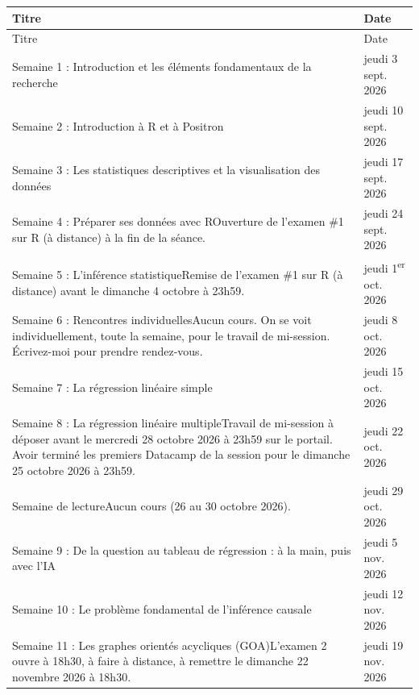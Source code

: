 \documentclass[10pt]{article}
\begin{document}
\vspace{4pt}
{\setlength{\arrayrulewidth}{0.4pt}\fontsize{9.5}{12}\selectfont
\noindent\begin{longtable}{|L{5.72in}|L{1.42in}|}
\hline
{}Titre & Date\\
\hline
\endfirsthead
\hline
{}Titre & Date\\
\hline
\endhead
Semaine 1 : Introduction et les éléments fondamentaux de la recherche & jeudi 3 sept. 2026\\
\hline
Semaine 2 : Introduction à R et à Positron & jeudi 10 sept. 2026\\
\hline
Semaine 3 : Les statistiques descriptives et la visualisation des données & jeudi 17 sept. 2026\\
\hline
Semaine 4 : Préparer ses données avec R\newline Ouverture de l'examen \#1 sur R (à distance) à la fin de la séance. & jeudi 24 sept. 2026\\
\hline
Semaine 5 : L'inférence statistique\newline Remise de l'examen \#1 sur R (à distance) avant le dimanche 4 octobre à 23h59. & jeudi 1\textsuperscript{er} oct. 2026\\
\hline
Semaine 6 : Rencontres individuelles\newline Aucun cours. On se voit individuellement, toute la semaine, pour le travail de mi-session. Écrivez-moi pour prendre rendez-vous. & jeudi 8 oct. 2026\\
\hline
Semaine 7 : La régression linéaire simple & jeudi 15 oct. 2026\\
\hline
Semaine 8 : La régression linéaire multiple\newline Travail de mi-session à déposer avant le mercredi 28 octobre 2026 à 23h59 sur le portail. Avoir terminé les premiers Datacamp de la session pour le dimanche 25 octobre 2026 à 23h59. & jeudi 22 oct. 2026\\
\hline
Semaine de lecture\newline Aucun cours (26 au 30 octobre 2026). & jeudi 29 oct. 2026\\
\hline
Semaine 9 : De la question au tableau de régression : à la main, puis avec l'IA & jeudi 5 nov. 2026\\
\hline
Semaine 10 : Le problème fondamental de l'inférence causale & jeudi 12 nov. 2026\\
\hline
Semaine 11 : Les graphes orientés acycliques (GOA)\newline L'examen 2 ouvre à 18h30, à faire à distance, à remettre le dimanche 22 novembre 2026 à 18h30. & jeudi 19 nov. 2026\\

\end{longtable}}
\end{document}

